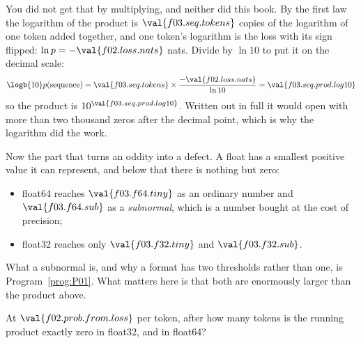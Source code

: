 \begin{fr}
You did not get that by multiplying, and neither did this book. By the first
law the logarithm of the product is $\val{f03.seq.tokens}$ copies of the
logarithm of one token added together, and one token's logarithm is the loss
with its sign flipped: $\ln p = -\val{f02.loss.nats}$ nats. Divide by $\ln 10$
to put it on the decimal scale:
\[ \logb{10} p(\text{sequence})
   = \val{f03.seq.tokens} \times \frac{-\val{f02.loss.nats}}{\ln 10}
   = \val{f03.seq.prod.log10} \]
so the product is $10^{\val{f03.seq.prod.log10}}$. Written out in full it would
open with more than two thousand zeros after the decimal point, which is why
the logarithm did the work.

Now the part that turns an oddity into a defect. A float has a smallest
positive value it can represent, and below that there is nothing but zero:

\begin{itemize}
\item float64 reaches $\val{f03.f64.tiny}$ as an ordinary number and
  $\val{f03.f64.sub}$ as a \emph{subnormal}, which is a number bought at the
  cost of precision;
\item float32 reaches only $\val{f03.f32.tiny}$ and $\val{f03.f32.sub}$.
\end{itemize}

What a subnormal is, and why a format has two thresholds rather than one, is
Program~\ref{prog:P01}. What matters here is that both are enormously larger
than the product above.

At $\val{f02.prob.from.loss}$ per token, after how many tokens is the running
product exactly zero \dash{} in float32, and in float64?
\nextframe
\end{fr}

